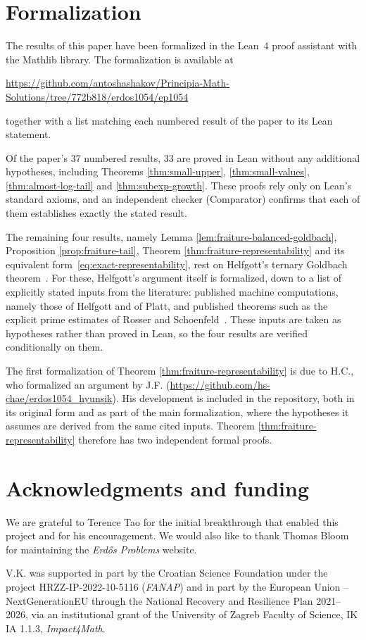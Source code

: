 \documentclass[11pt,letterpaper,reqno]{amsart}
\numberwithin{equation}{section}
\theoremstyle{remark}
\begin{document}

\section*{Formalization}

The results of this paper have been formalized in the Lean~4 proof assistant
with the Mathlib library. The formalization is available at
\begin{center}
\url{https://github.com/antoshashakov/Principia-Math-Solutions/tree/772b818/erdos1054/ep1054}
\end{center}
together with a list matching each numbered result of the paper to its Lean
statement.

Of the paper's 37 numbered results, 33 are proved in Lean without any
additional hypotheses, including Theorems \ref{thm:small-upper},
\ref{thm:small-values}, \ref{thm:almost-log-tail} and \ref{thm:subexp-growth}.
These proofs rely only on Lean's standard axioms, and an independent checker
(Comparator) confirms that each of them establishes exactly the stated result.

The remaining four results, namely Lemma \ref{lem:fraiture-balanced-goldbach},
Proposition \ref{prop:fraiture-tail}, Theorem \ref{thm:fraiture-representability}
and its equivalent form~\eqref{eq:exact-representability}, rest on Helfgott's
ternary Goldbach theorem~\cite{Helfgott}. For these, Helfgott's argument itself
is formalized, down to a list of explicitly stated inputs from the literature:
published machine computations, namely those of Helfgott and of Platt, and
published theorems such as the explicit prime estimates of Rosser and
Schoenfeld~\cite{RosserSchoenfeld}. These inputs are taken as hypotheses rather
than proved in Lean, so the four results are verified conditionally on them.

The first formalization of Theorem \ref{thm:fraiture-representability} is due to
H.C., who formalized an argument by J.F.
(\url{https://github.com/hs-chae/erdos1054_hyunsik}). His development is included
in the repository, both in its original form and as part of the main
formalization, where the hypotheses it assumes are derived from the same cited
inputs. Theorem \ref{thm:fraiture-representability} therefore has two independent
formal proofs.


\section*{Acknowledgments and funding}
We are grateful to Terence Tao for the initial breakthrough that enabled this project and for his encouragement. We would also like to thank Thomas Bloom for maintaining the \emph{Erd\H{o}s Problems} website.

V.K. was supported in part by the Croatian Science Foundation under the project HRZZ-IP-2022-10-5116 (\emph{FANAP}) and in part by the European Union -- NextGenerationEU through the National Recovery and Resilience Plan 2021--2026, via an institutional grant of the University of Zagreb Faculty of Science, IK IA 1.1.3, \emph{Impact4Math}.




\end{document}
